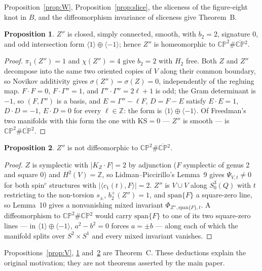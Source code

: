 \documentclass[11pt]{article}
\newcommand{\CP}{\mathbb{CP}}
\newcommand{\CPbar}{\CP^2\#\overline{\CP}{}^2}
\newcommand{\Z}{\mathbb{Z}}
\newcommand{\pione}{\pi_1}
\newcommand{\Zpp}{Z''}
\newcommand{\Gpp}{\Gamma''}
\theoremstyle{definition}
\newtheorem{proposition}{Proposition}[section]
\begin{document}
Proposition~\ref{prop:W}, Proposition~\ref{prop:slice}, the sliceness of
the figure-eight knot in $B$, and the diffeomorphism invariance of
sliceness give Theorem~B.

\begin{proposition}\label{prop:Zpp}
$\Zpp$ is closed, simply connected, smooth, with $b_2=2$, signature $0$,
and odd intersection form $\langle1\rangle\oplus\langle-1\rangle$; hence
$\Zpp$ is homeomorphic to $\CPbar$.
\end{proposition}

\begin{proof}
$\pione(\Zpp)=1$ and $\chi(\Zpp)=4$ give $b_2=2$ with $H_2$ free. Both
$Z$ and $\Zpp$ decompose into the same two oriented copies of $V$ along
their common boundary, so Novikov additivity gives
$\sigma(\Zpp)=\sigma(Z)=0$, independently of the regluing map.
$F\cdot F=0$, $F\cdot\Gpp=1$, and
$\Gpp\cdot\Gpp=2\ell+1$ is odd; the Gram determinant is $-1$, so
$(F,\Gpp)$ is a basis, and $E=\Gpp-\ell F$, $D=F-E$ satisfy $E\cdot E=1$,
$D\cdot D=-1$, $E\cdot D=0$ for every $\ell\in\Z$: the form is
$\langle1\rangle\oplus\langle-1\rangle$. Of Freedman's two manifolds with
this form the one with $\mathrm{KS}=0$ --- $\Zpp$ is smooth --- is
$\CPbar$.
\end{proof}

\begin{proposition}\label{prop:Zppnot}
$\Zpp$ is not diffeomorphic to $\CPbar$.
\end{proposition}

\begin{proof}
$Z$ is symplectic with $|K_Z\cdot F|=2$ by adjunction ($F$ symplectic of
genus 2 and square 0) and $H^2(V)=\Z$, so Lidman--Piccirillo's Lemma~9
gives $\Psi_{V,t}\ne0$ for both spin$^c$ structures with
$|\langle c_1(t),F\rangle|=2$. $\Zpp$ is $V\cup V$ along $S^3_0(Q)$ with
$t$ restricting to the non-torsion $s_\pm$, $b_2^+(\Zpp)=1$, and
$\mathrm{span}\{F\}$ a square-zero line, so Lemma~10 gives a nonvanishing
mixed invariant $\Phi_{\Zpp,\mathrm{span}\{F\},t}$. A diffeomorphism to
$\CPbar$ would carry $\mathrm{span}\{F\}$ to one of its two square-zero
lines --- in $\langle1\rangle\oplus\langle-1\rangle$, $a^2-b^2=0$ forces
$a=\pm b$ --- along each of which the manifold splits over $S^2\times S^1$
and every mixed invariant vanishes.
\end{proof}

Propositions~\ref{prop:V}, \ref{prop:Zpp} and~\ref{prop:Zppnot} are
Theorem~C.  These deductions explain the original motivation; they are not
theorems asserted by the main paper.
\end{document}
